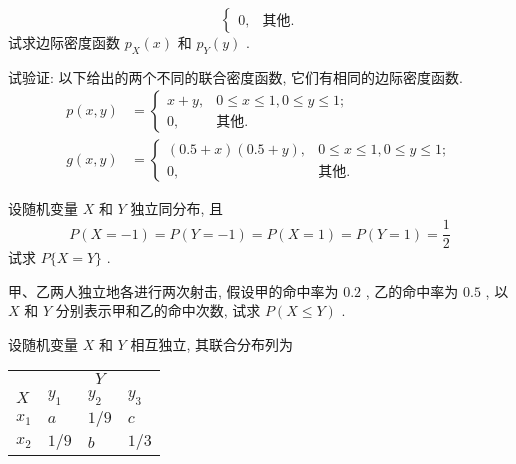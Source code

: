 \begin{xiti}
\begin{equation*}
\begin{cases}
   			0, & \text{其他}.
   			\end{cases}
   		\end{equation*}
   		试求边际密度函数 $p_{X}(x)$ 和 $p_{Y}(y)$ .
   		\item 试验证: 以下给出的两个不同的联合密度函数, 它们有相同的边际密度函数.
   		\begin{align*}
   			p(x,y) &= \begin{cases}
   			x+y, & 0\leqslant x\leqslant1,0\leqslant y\leqslant1;\\
   			0, & \text{其他}.
   			\end{cases}\\
   			g(x,y) &= \begin{cases}
   			(0.5+x)(0.5+y), & 0\leqslant x\leqslant1,0\leqslant y\leqslant1;\\
   			0, & \text{其他}.
   			\end{cases}
   		\end{align*}
   		\item 设随机变量 $X$ 和 $Y$ 独立同分布, 且
   		\begin{equation*}
   			P(X=-1)=P(Y=-1)=P(X=1)=P(Y=1)=\frac{1}{2}
   		\end{equation*}
   		试求 $P\{X=Y\}$ .
   		\item 甲、乙两人独立地各进行两次射击, 假设甲的命中率为 $0.2$ , 乙的命中率为 $0.5$ , 以 $X$ 和 $Y$ 分别表示甲和乙的命中次数, 试求 $P(X\leqslant Y)$ .
   		\item 设随机变量 $X$ 和 $Y$ 相互独立, 其联合分布列为
   		\begin{center}
   			\begin{tabularx}{0.8\textwidth}{ZZZZ}
   				\hline
   				 & \\
   				$X$ & $y_1$ & $y_2$ & $y_3$\\
   				\hline
   				$x_1$ & $a$ & $1/9$ & $c$\\
   				\hline
   				$x_2$ & $1/9$ & $b$ & $1/3$\\
   				\hline
   			\end{tabularx}
   		\end{center}
   	

\end{xiti}
